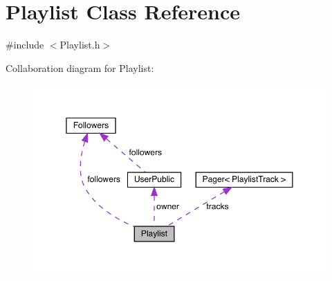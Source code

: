 \hypertarget{class_playlist}{}\section{Playlist Class Reference}
\label{class_playlist}


{\ttfamily \#include $<$Playlist.\+h$>$}



Collaboration diagram for Playlist\+:
\nopagebreak
\begin{figure}[H]
\begin{center}
\leavevmode
\includegraphics[width=350pt]{class_playlist__coll__graph}
\end{center}
\end{figure}
